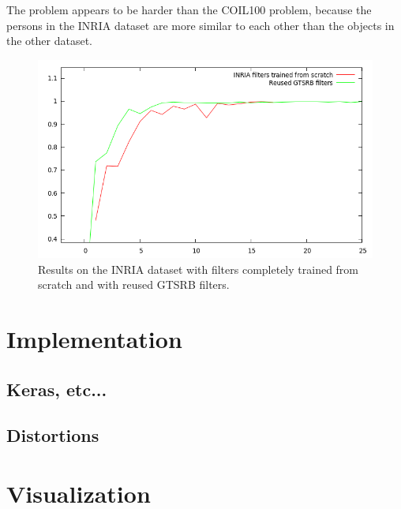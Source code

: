 \documentclass[11pt, a4paper]{article}
\begin{document}
The problem appears to be harder than the COIL100 problem, because the persons in the INRIA dataset are more similar to each other than the objects in the other dataset.

\begin{figure}[h!]
	\centering
	\includegraphics[width=1\textwidth]{inria_results.png}
	\caption{Results on the INRIA dataset with filters completely trained from scratch and with reused GTSRB filters.}
	\label{fig:inria_results}
\end{figure}

\begin{appendix}
	\section{Implementation}
	
	\subsection{Keras, etc...}
	
	\subsection{Distortions}
	
	\label{sec:implementation-distortions}
	\section{Visualization}
\end{appendix}

{}

\end{document}
